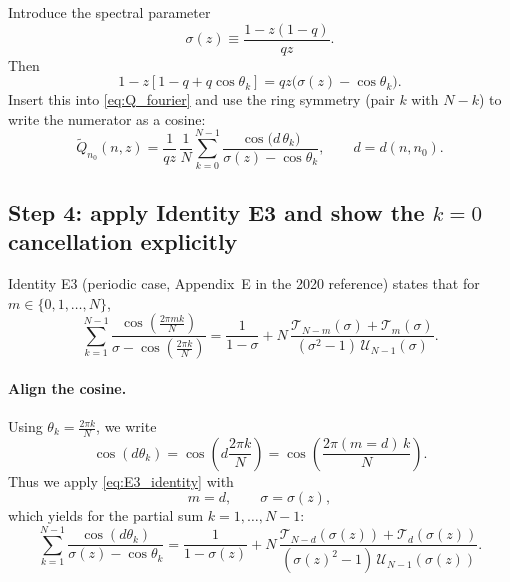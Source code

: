 \documentclass[11pt]{article}
\newcommand{\T}{\mathcal{T}}
\newcommand{\U}{\mathcal{U}}
\begin{document}
Introduce the spectral parameter
\begin{equation}
\sigma(z)\equiv \frac{1-z(1-q)}{qz}.
\label{eq:sigma_def}
\end{equation}
Then
\[
1-z[1-q+q\cos\theta_k]=qz\bigl(\sigma(z)-\cos\theta_k\bigr).
\]
Insert this into \eqref{eq:Q_fourier} and use the ring symmetry (pair $k$ with $N-k$) to write the numerator as a cosine:
\begin{equation}
\tilde Q_{n_0}(n,z)
=
\frac{1}{qz}\,\frac{1}{N}\sum_{k=0}^{N-1}\frac{\cos\!\bigl(d\,\theta_k\bigr)}{\sigma(z)-\cos\theta_k},
\qquad d=d(n,n_0).
\label{eq:Q_cos_sum}
\end{equation}

\subsection{Step 4: apply Identity E3 and show the $k=0$ cancellation explicitly}

Identity E3 (periodic case, Appendix~E in the 2020 reference) states that for $m\in\{0,1,\dots,N\}$,
\begin{equation}
\sum_{k=1}^{N-1}\frac{\cos\!\left(\frac{2\pi m k}{N}\right)}{\sigma-\cos\!\left(\frac{2\pi k}{N}\right)}
=
\frac{1}{1-\sigma}
+
N\,\frac{\T_{N-m}(\sigma)+\T_m(\sigma)}{(\sigma^2-1)\,\U_{N-1}(\sigma)}.
\label{eq:E3_identity}
\end{equation}

\paragraph{Align the cosine.}
Using $\theta_k=\frac{2\pi k}{N}$, we write
\[
\cos(d\theta_k)=\cos\!\left(d\frac{2\pi k}{N}\right)=\cos\!\left(\frac{2\pi(m=d)\,k}{N}\right).
\]
Thus we apply \eqref{eq:E3_identity} with
\[
m=d,\qquad \sigma=\sigma(z),
\]
which yields for the partial sum $k=1,\dots,N-1$:
\begin{equation}
\sum_{k=1}^{N-1}\frac{\cos(d\theta_k)}{\sigma(z)-\cos\theta_k}
=
\frac{1}{1-\sigma(z)}
+
N\,\frac{\T_{N-d}(\sigma(z))+\T_{d}(\sigma(z))}{(\sigma(z)^2-1)\,\U_{N-1}(\sigma(z))}.
\label{eq:partial_sum}
\end{equation}
\end{document}
